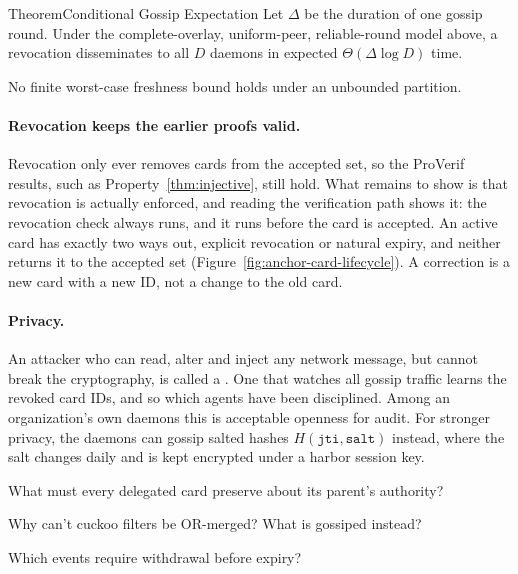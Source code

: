 \documentclass[11pt,a4paper]{article}
\theoremstyle{definition}
\begin{document}
\begin{pdclaim}{Theorem}{Conditional Gossip Expectation}
\setlength{\parskip}{4pt plus 1pt}
\label{prop:fresh}
Let $\Delta$ be the duration of one gossip round. Under the complete-overlay, uniform-peer, reliable-round model above, a revocation disseminates to all $D$ daemons in expected $\Theta(\Delta\log D)$ time.

No finite worst-case freshness bound holds under an unbounded partition.
\end{pdclaim}




\paragraph{Revocation keeps the earlier proofs valid.} Revocation only ever removes cards from the accepted set, so the ProVerif results, such as Property~\ref{thm:injective}, still hold. What remains to show is that revocation is actually enforced, and reading the verification path shows it: the revocation check always runs, and it runs before the card is accepted. An active card has exactly two ways out, explicit revocation or natural expiry, and neither returns it to the accepted set (Figure~\ref{fig:anchor-card-lifecycle}). A correction is a new card with a new ID, not a change to the old card.


\pdmarginpagebreak

\paragraph{Privacy.} An attacker who can read, alter and inject any network message, but cannot break the cryptography, is called a . One that watches all gossip traffic learns the revoked card IDs, and so which agents have been disciplined. Among an organization's own daemons this is acceptable openness for audit. For stronger privacy, the daemons can gossip salted hashes $H(\texttt{jti}, \texttt{salt})$ instead, where the salt changes daily and is kept encrypted under a harbor session key.

\begin{pdrecitation}
\item What must every delegated card preserve about its parent's authority?
\item Why can't cuckoo filters be OR-merged? What is gossiped instead?
\item Which events require withdrawal before expiry?
\end{pdrecitation}
\end{document}
